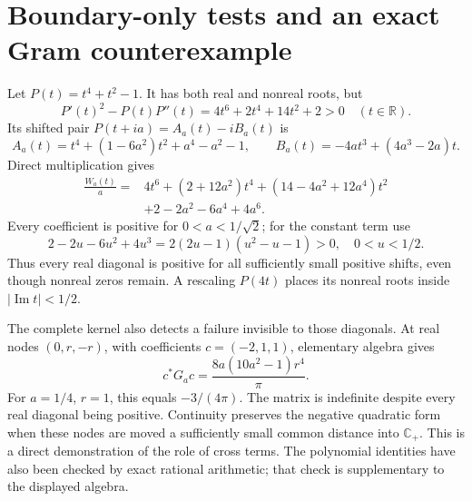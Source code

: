 \documentclass[11pt,letterpaper]{article}
\numberwithin{equation}{section}
\theoremstyle{definition}
\theoremstyle{remark}
\newcommand{\R}{\mathbb R}
\newcommand{\Cp}{\mathbb C_+}
\newcommand{\Impart}{\operatorname{Im}}
\begin{document}
\appendix
\section{Boundary-only tests and an exact Gram counterexample}\label{app:counterexample}
Let $P(t)=t^4+t^2-1$. It has both real and nonreal roots, but
\begin{equation}\label{eq:polynomialL1}
P'(t)^2-P(t)P''(t)=4t^6+2t^4+14t^2+2>0
\quad(t\in\R).
\end{equation}
Its shifted pair $P(t+ia)=A_a(t)-iB_a(t)$ is
\[
A_a(t)=t^4+(1-6a^2)t^2+a^4-a^2-1,\qquad
B_a(t)=-4at^3+(4a^3-2a)t.
\]
Direct multiplication gives
\begin{equation}\label{eq:polynomialW}
\begin{split}
\frac{W_a(t)}a={}&4t^6+(2+12a^2)t^4
+(14-4a^2+12a^4)t^2\\
&+2-2a^2-6a^4+4a^6.
\end{split}
\end{equation}
Every coefficient is positive for $0<a<1/\sqrt2$; for the constant term use
\[
2-2u-6u^2+4u^3=2(2u-1)(u^2-u-1)>0,
\quad 0<u<1/2.
\]
Thus every real diagonal is positive for all sufficiently small positive shifts, even though nonreal zeros remain. A rescaling $P(4t)$ places its nonreal roots inside $|\Impart t|<1/2$.

The complete kernel also detects a failure invisible to those diagonals. At real nodes $(0,r,-r)$, with coefficients $c=(-2,1,1)$, elementary algebra gives
\begin{equation}\label{eq:negativeGram}
c^*G_ac=\frac{8a(10a^2-1)r^4}{\pi}.
\end{equation}
For $a=1/4$, $r=1$, this equals $-3/(4\pi)$. The matrix is indefinite despite every real diagonal being positive. Continuity preserves the negative quadratic form when these nodes are moved a sufficiently small common distance into $\Cp$. This is a direct demonstration of the role of cross terms. The polynomial identities have also been checked by exact rational arithmetic; that check is supplementary to the displayed algebra.
\end{document}

